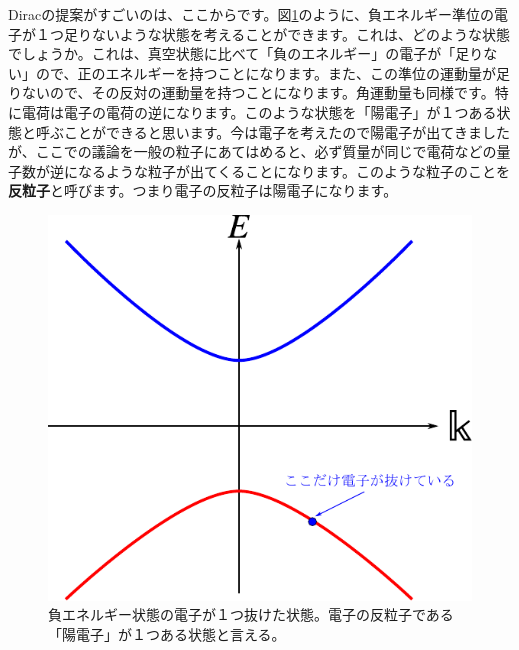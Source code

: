 \documentclass[report,paper=a4, fontsize=12pt, line_length=16cm, number_of_lines=33,dvipdfmx]{jlreq}
\numberwithin{equation}{chapter}
\newcommand{\strong}[1]{{\sffamily \bfseries #1}}
\begin{document}
Diracの提案がすごいのは、ここからです。図\ref{fig:antiparticle}のように、負エネルギー準位の電子が１つ足りないような状態を考えることができます。これは、どのような状態でしょうか。これは、真空状態に比べて「負のエネルギー」の電子が「足りない」ので、正のエネルギーを持つことになります。また、この準位の運動量が足りないので、その反対の運動量を持つことになります。角運動量も同様です。特に電荷は電子の電荷の逆になります。このような状態を「陽電子」が１つある状態と呼ぶことができると思います。今は電子を考えたので陽電子が出てきましたが、ここでの議論を一般の粒子にあてはめると、必ず質量が同じで電荷などの量子数が逆になるような粒子が出てくることになります。このような粒子のことを\strong{反粒子}と呼びます。つまり電子の反粒子は陽電子になります。
\begin{figure}[htbp]
  \centering
  \includegraphics{antiparticle.pdf}
  \caption{負エネルギー状態の電子が１つ抜けた状態。電子の反粒子である「陽電子」が１つある状態と言える。}
  \label{fig:antiparticle}
\end{figure}
\end{document}
